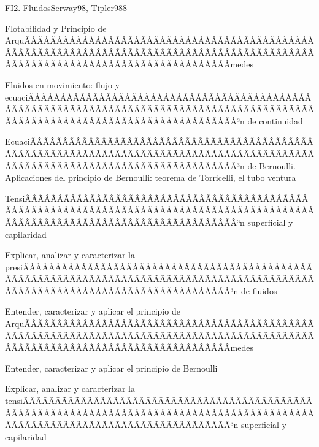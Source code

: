 \begin{sumilla}
\begin{unit}{FI2. Fluidos}{Serway98, Tipler98}{8}
\begin{topicos}
	 \item  Flotabilidad y Principio de ArquÃÂÃÂÃÂÃÂÃÂÃÂÃÂÃÂÃÂÃÂÃÂÃÂÃÂÃÂÃÂÃÂÃÂÃÂÃÂÃÂÃÂÃÂÃÂÃÂÃÂÃÂÃÂÃÂÃÂÃÂÃÂÃÂÃÂÃÂÃÂÃÂÃÂÃÂÃÂÃÂÃÂÃÂÃÂÃÂÃÂÃÂÃÂÃÂÃÂÃÂÃÂÃÂÃÂÃÂÃÂÃÂÃÂÃÂÃÂÃÂÃÂÃÂÃÂÃÂ­medes
         \item  Fluidos en movimiento: flujo y ecuaciÃÂÃÂÃÂÃÂÃÂÃÂÃÂÃÂÃÂÃÂÃÂÃÂÃÂÃÂÃÂÃÂÃÂÃÂÃÂÃÂÃÂÃÂÃÂÃÂÃÂÃÂÃÂÃÂÃÂÃÂÃÂÃÂÃÂÃÂÃÂÃÂÃÂÃÂÃÂÃÂÃÂÃÂÃÂÃÂÃÂÃÂÃÂÃÂÃÂÃÂÃÂÃÂÃÂÃÂÃÂÃÂÃÂÃÂÃÂÃÂÃÂÃÂÃÂÃÂ³n de continuidad
	 \item  EcuaciÃÂÃÂÃÂÃÂÃÂÃÂÃÂÃÂÃÂÃÂÃÂÃÂÃÂÃÂÃÂÃÂÃÂÃÂÃÂÃÂÃÂÃÂÃÂÃÂÃÂÃÂÃÂÃÂÃÂÃÂÃÂÃÂÃÂÃÂÃÂÃÂÃÂÃÂÃÂÃÂÃÂÃÂÃÂÃÂÃÂÃÂÃÂÃÂÃÂÃÂÃÂÃÂÃÂÃÂÃÂÃÂÃÂÃÂÃÂÃÂÃÂÃÂÃÂÃÂ³n de Bernoulli. Aplicaciones del principio de Bernoulli: teorema de Torricelli, el tubo ventura
         \item  TensiÃÂÃÂÃÂÃÂÃÂÃÂÃÂÃÂÃÂÃÂÃÂÃÂÃÂÃÂÃÂÃÂÃÂÃÂÃÂÃÂÃÂÃÂÃÂÃÂÃÂÃÂÃÂÃÂÃÂÃÂÃÂÃÂÃÂÃÂÃÂÃÂÃÂÃÂÃÂÃÂÃÂÃÂÃÂÃÂÃÂÃÂÃÂÃÂÃÂÃÂÃÂÃÂÃÂÃÂÃÂÃÂÃÂÃÂÃÂÃÂÃÂÃÂÃÂÃÂ³n superficial y capilaridad
   \end{topicos}

   \begin{objetivos}
         \item  Explicar, analizar y caracterizar la presiÃÂÃÂÃÂÃÂÃÂÃÂÃÂÃÂÃÂÃÂÃÂÃÂÃÂÃÂÃÂÃÂÃÂÃÂÃÂÃÂÃÂÃÂÃÂÃÂÃÂÃÂÃÂÃÂÃÂÃÂÃÂÃÂÃÂÃÂÃÂÃÂÃÂÃÂÃÂÃÂÃÂÃÂÃÂÃÂÃÂÃÂÃÂÃÂÃÂÃÂÃÂÃÂÃÂÃÂÃÂÃÂÃÂÃÂÃÂÃÂÃÂÃÂÃÂÃÂ³n de fluidos
         \item  Entender, caracterizar y aplicar el principio de ArquÃÂÃÂÃÂÃÂÃÂÃÂÃÂÃÂÃÂÃÂÃÂÃÂÃÂÃÂÃÂÃÂÃÂÃÂÃÂÃÂÃÂÃÂÃÂÃÂÃÂÃÂÃÂÃÂÃÂÃÂÃÂÃÂÃÂÃÂÃÂÃÂÃÂÃÂÃÂÃÂÃÂÃÂÃÂÃÂÃÂÃÂÃÂÃÂÃÂÃÂÃÂÃÂÃÂÃÂÃÂÃÂÃÂÃÂÃÂÃÂÃÂÃÂÃÂÃÂ­medes
         \item  Entender, caracterizar y aplicar el principio de Bernoulli
         \item  Explicar, analizar y caracterizar la tensiÃÂÃÂÃÂÃÂÃÂÃÂÃÂÃÂÃÂÃÂÃÂÃÂÃÂÃÂÃÂÃÂÃÂÃÂÃÂÃÂÃÂÃÂÃÂÃÂÃÂÃÂÃÂÃÂÃÂÃÂÃÂÃÂÃÂÃÂÃÂÃÂÃÂÃÂÃÂÃÂÃÂÃÂÃÂÃÂÃÂÃÂÃÂÃÂÃÂÃÂÃÂÃÂÃÂÃÂÃÂÃÂÃÂÃÂÃÂÃÂÃÂÃÂÃÂÃÂ³n superficial y capilaridad
   \end{objetivos}
\end{unit}


\end{sumilla}
